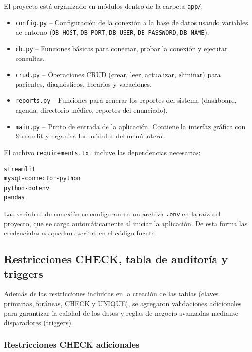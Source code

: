 \documentclass[12pt,a4paper]{article}
\begin{document}
El proyecto est\'a organizado en m\'odulos dentro de la carpeta \texttt{app/}:

\begin{itemize}
    \item \texttt{config.py} -- Configuraci\'on de la conexi\'on a la base de datos usando variables de entorno (\texttt{DB\_HOST}, \texttt{DB\_PORT}, \texttt{DB\_USER}, \texttt{DB\_PASSWORD}, \texttt{DB\_NAME}).
    \item \texttt{db.py} -- Funciones b\'asicas para conectar, probar la conexi\'on y ejecutar consultas.
    \item \texttt{crud.py} -- Operaciones CRUD (crear, leer, actualizar, eliminar) para pacientes, diagn\'osticos, horarios y vacaciones.
    \item \texttt{reports.py} -- Funciones para generar los reportes del sistema (dashboard, agenda, directorio m\'edico, reportes del enunciado).
    \item \texttt{main.py} -- Punto de entrada de la aplicaci\'on. Contiene la interfaz gr\'afica con Streamlit y organiza los m\'odulos del men\'u lateral.
\end{itemize}

El archivo \texttt{requirements.txt} incluye las dependencias necesarias:

{\small\begin{verbatim}
streamlit
mysql-connector-python
python-dotenv
pandas
\end{verbatim}}

Las variables de conexi\'on se configuran en un archivo \texttt{.env} en la ra\'iz del proyecto, que se carga autom\'aticamente al iniciar la aplicaci\'on. De esta forma las credenciales no quedan escritas en el c\'odigo fuente.

\newpage
\subsection{Restricciones CHECK, tabla de auditor\'ia y triggers}

Adem\'as de las restricciones incluidas en la creaci\'on de las tablas (claves primarias, for\'aneas, CHECK y UNIQUE), se agregaron validaciones adicionales para garantizar la calidad de los datos y reglas de negocio avanzadas mediante disparadores (triggers).

\subsubsection{Restricciones CHECK adicionales}
\end{document}
